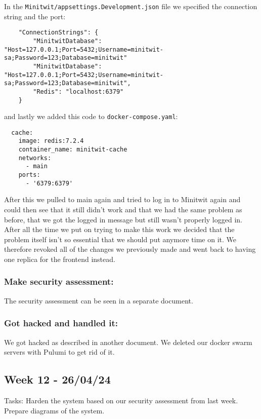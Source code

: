 In the \texttt{Minitwit/appsettings.Development.json} file we specified the connection string and the port:

\begin{verbatim}
    "ConnectionStrings": {
        "MinitwitDatabase": "Host=127.0.0.1;Port=5432;Username=minitwit-sa;Password=123;Database=minitwit"
        "MinitwitDatabase": "Host=127.0.0.1;Port=5432;Username=minitwit-sa;Password=123;Database=minitwit",
        "Redis": "localhost:6379"
    }
\end{verbatim}

and lastly we added this code to \texttt{docker-compose.yaml}:

\begin{verbatim}
  cache:
    image: redis:7.2.4
    container_name: minitwit-cache
    networks:
      - main
    ports:
      - '6379:6379'
\end{verbatim}

After this we pulled to main again and tried to log in to Minitwit again and could then see that it still didn't work and that we had the same problem as before, that we got the logged in message but still wasn't properly logged in. After all the time we put on trying to make this work we decided that the problem itself isn't so essential that we should put anymore time on it. We therefore revoked all of the changes we previously made and went back to having one replica for the frontend instead.

\subsubsection{Make security assessment:}
\label{log:make-security-assessment}

The security assessment can be seen in a separate document.

\subsubsection{Got hacked and handled it:}
\label{log:got-hacked-and-handled-it}

We got hacked as described in another document. We deleted our docker
swarm servers with Pulumi to get rid of it.

\subsection{Week 12 - 26/04/24}
\label{week12}

Tasks: Harden the system based on our security assessment from last week. Prepare diagrams of the system.

